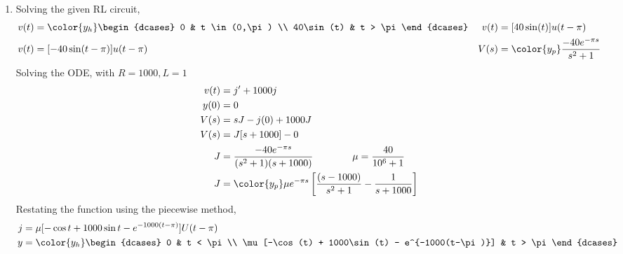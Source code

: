 \begin{enumerate}
    \item Solving the given RL circuit,
          \begin{align}
              v(t) & = \color{y_h}\begin{dcases}
                                      0         & t \in (0,\pi) \\
                                      40\sin(t) & t > \pi
                                  \end{dcases}                &
              v(t) & = [40\sin(t)]u(t - \pi)                       \\
              v(t) & = [-40\sin(t-\pi)]u(t-\pi)                  &
              V(s) & = \color{y_p} \frac{-40e^{-\pi s}}{s^2 + 1}
          \end{align}
          Solving the ODE, with $ R = 1000, L = 1 $
          \begin{align}
              v(t) & = j' + 1000j                                             \\
              y(0) & = 0                                                      \\
              V(s) & = sJ - j(0) + 1000J                                      \\
              V(s) & = J[s + 1000] - 0                                        \\
              J    & = \frac{-40e^{-\pi s}}{(s^2 + 1)(s + 1000)} \qquad\qquad
              \mu  = \frac{40}{10^6 + 1}                                      \\
              J    & = \color{y_p} \mu e^{-\pi s} \left[ \frac{(s - 1000)}
                  {s^2 + 1} - \frac{1}{s + 1000} \right]
          \end{align}
          Restating the function using the piecewise method,
          \begin{align}
              j & = \mu [-\cos t + 1000\sin t - e^{-1000(t - \pi)}] U(t - \pi) \\
              y & = \color{y_h}
              \begin{dcases}
                  0                                              & t < \pi \\
                  \mu[-\cos(t) + 1000\sin(t) - e^{-1000(t-\pi)}] & t > \pi
              \end{dcases}
          \end{align}


\end{enumerate}
